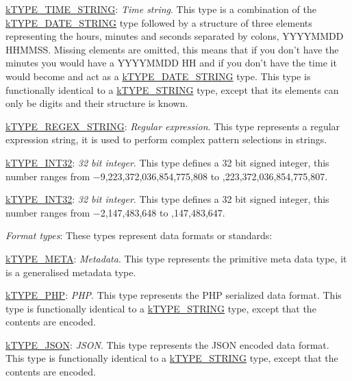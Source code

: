 \begin{DoxyItemize}
\begin{DoxyItemize}
\item {\ttfamily \hyperlink{}{k\-T\-Y\-P\-E\-\_\-\-T\-I\-M\-E\-\_\-\-S\-T\-R\-I\-N\-G}}\-: {\itshape Time string}. This type is a combination of the \hyperlink{}{k\-T\-Y\-P\-E\-\_\-\-D\-A\-T\-E\-\_\-\-S\-T\-R\-I\-N\-G} type followed by a structure of three elements representing the hours, minutes and seconds separated by colons, {\ttfamily Y\-Y\-Y\-Y\-M\-M\-D\-D H\-H\-M\-M\-S\-S}. Missing elements are omitted, this means that if you don't have the minutes you would have a {\ttfamily Y\-Y\-Y\-Y\-M\-M\-D\-D H\-H} and if you don't have the time it would become and act as a \hyperlink{}{k\-T\-Y\-P\-E\-\_\-\-D\-A\-T\-E\-\_\-\-S\-T\-R\-I\-N\-G} type. This type is functionally identical to a \hyperlink{}{k\-T\-Y\-P\-E\-\_\-\-S\-T\-R\-I\-N\-G} type, except that its elements can only be digits and their structure is known. 
\item {\ttfamily \hyperlink{}{k\-T\-Y\-P\-E\-\_\-\-R\-E\-G\-E\-X\-\_\-\-S\-T\-R\-I\-N\-G}}\-: {\itshape Regular expression}. This type represents a regular expression string, it is used to perform complex pattern selections in strings. 
\item {\ttfamily \hyperlink{}{k\-T\-Y\-P\-E\-\_\-\-I\-N\-T32}}\-: {\itshape 32 bit integer}. This type defines a 32 bit signed integer, this number ranges from {\ttfamily −9,223,372,036,854,775,808} to {,223,372,036,854,775,807}. 
\item {\ttfamily \hyperlink{}{k\-T\-Y\-P\-E\-\_\-\-I\-N\-T32}}\-: {\itshape 32 bit integer}. This type defines a 32 bit signed integer, this number ranges from {\ttfamily −2,147,483,648} to {,147,483,647}. 
\end{DoxyItemize}
\item {\itshape Format types}\-: These types represent data formats or standards\-: 
\begin{DoxyItemize}
\item {\ttfamily \hyperlink{}{k\-T\-Y\-P\-E\-\_\-\-M\-E\-T\-A}}\-: {\itshape Metadata}. This type represents the primitive meta data type, it is a generalised metadata type. 
\item {\ttfamily \hyperlink{}{k\-T\-Y\-P\-E\-\_\-\-P\-H\-P}}\-: {\itshape P\-H\-P}. This type represents the {\ttfamily P\-H\-P} serialized data format. This type is functionally identical to a \hyperlink{}{k\-T\-Y\-P\-E\-\_\-\-S\-T\-R\-I\-N\-G} type, except that the contents are encoded. 
\item {\ttfamily \hyperlink{}{k\-T\-Y\-P\-E\-\_\-\-J\-S\-O\-N}}\-: {\itshape J\-S\-O\-N}. This type represents the {\ttfamily J\-S\-O\-N} encoded data format. This type is functionally identical to a \hyperlink{}{k\-T\-Y\-P\-E\-\_\-\-S\-T\-R\-I\-N\-G} type, except that the contents are encoded. 

\end{DoxyItemize}
\end{DoxyItemize}
